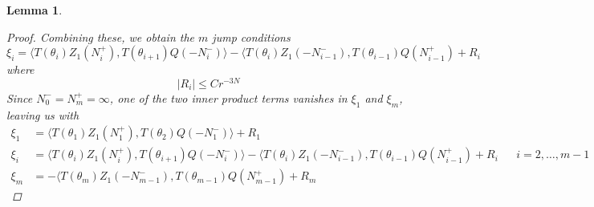 \documentclass[12pt]{article}
\newtheorem{lemma}{Lemma}
\begin{document}
\begin{lemma}
\begin{proof}
Combining these, we obtain the $m$ jump conditions
\[
\xi_i = \langle T(\theta_i) Z_1(N_i^+), T(\theta_{i+1}) Q(-N_i^-) \rangle
- \langle T(\theta_i) Z_1(-N_{i-1}^-), T(\theta_{i-1}) Q(N_{i-1}^+) + R_i
\]
where 
\[
|R_i| \leq C r^{-3N}
\]
Since $N_0^- = N_m^+ = \infty$, one of the two inner product terms vanishes in $\xi_1$ and $\xi_m$, leaving us with
\begin{align*}
\xi_1 &= \langle T(\theta_1) Z_1(N_1^+), T(\theta_2) Q(-N_1^-) \rangle + R_1  \\
\xi_i &= \langle T(\theta_i) Z_1(N_i^+), T(\theta_{i+1}) Q(-N_i^-) \rangle
- \langle T(\theta_i) Z_1(-N_{i-1}^-), T(\theta_{i-1}) Q(N_{i-1}^+) + R_i &&
i = 2, \dots, m-1 \\
\xi_m &= -\langle T(\theta_m) Z_1(-N_{m-1}^-), T(\theta_{m-1}) Q(N_{m-1}^+) + R_m
\end{align*}

\end{proof}
\end{lemma}
\end{document}
